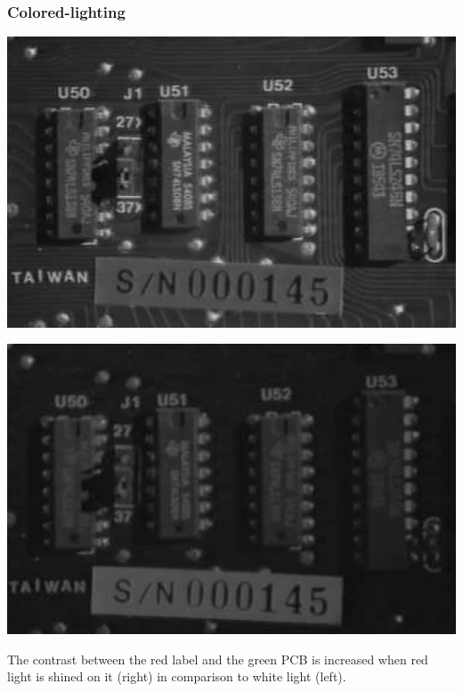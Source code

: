 \documentclass[a4paper, fontsize=8pt, landscape, DIV=1]{scrartcl}
\begin{document}
\begin{multicols*}{4}
		\subsubsection{Colored-lighting}
		\begin{minipage}[t]{0.49\columnwidth}
			\begin{flushleft}
				\includegraphics[width=\columnwidth]{images//ImageAcq/white_light.png}\\
			\end{flushleft}
		\end{minipage}
		\begin{minipage}[b]{0.49\columnwidth}
			\begin{flushleft}
				\includegraphics[width=\columnwidth]{images//ImageAcq/red_light.png}\\
			\end{flushleft}
		\end{minipage}
		The contrast between the red label and the green PCB is increased when red light is shined on it (right) in comparison to white light (left).\\

\end{multicols*}
\end{document}
